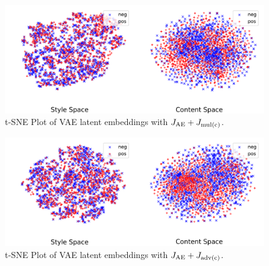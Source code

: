 \documentclass[letterpaper]{article}
\begin{document}
\begin{figure}[ht]
	\includegraphics[width=\linewidth]{vae-latent-spaces-rec-mulc}
	\caption{t-SNE Plot of VAE latent embeddings with $J_{\text{AE}} + J_{\text{mul(c)}}$.}
	\label{fig:rec-and-mulc}
\end{figure}

\begin{figure}[ht]
	\includegraphics[width=\linewidth]{vae-latent-spaces-rec-advc}
	\caption{t-SNE Plot of VAE latent embeddings with $J_{\text{AE}} + J_{\text{adv(c)}}$.}
	\label{fig:rec-and-advc}
\end{figure}
\end{document}
